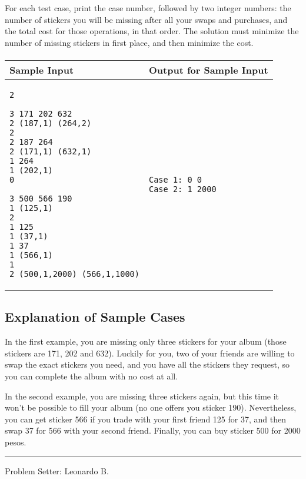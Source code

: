 \documentclass[12pt]{article}
\newcommand{\FFATitle}[1]{{%
  \color{tango-skyblue-2}\sffamily\large\bfseries\hspace{-0.4em} #1}}
\begin{document}
For each test case, print the case number, followed by two integer
numbers: the number of stickers you will be missing after all your swaps
and purchases, and the total cost for those operations, in that order.
The solution must minimize the number of missing stickers in first
place, and then minimize the cost.

\paragraph{}

\vspace{-20pt}

\noindent

\begin{tabular}{|l|l|}
  \hline
  \FFATitle{Sample Input} &
  \FFATitle{Output for Sample Input} \\
  \hline
  \begin{minipage}[t]{0.48\textwidth}
    \vspace{-8pt}
    \begin{verbatim}2

3 171 202 632
2 (187,1) (264,2)
2
2 187 264
2 (171,1) (632,1)
1 264
1 (202,1)
0

3 500 566 190
1 (125,1)
2
1 125
1 (37,1)
1 37
1 (566,1)
1
2 (500,1,2000) (566,1,1000)\end{verbatim}
    \vspace{-4pt}
  \end{minipage} &
  \begin{minipage}[t]{0.48\textwidth}
    \vspace{-8pt}
    \begin{verbatim}Case 1: 0 0
Case 2: 1 2000\end{verbatim}
    \vspace{-4pt}
  \end{minipage} \\
  \hline
\end{tabular}

\subsection{Explanation of Sample
Cases}\label{explanation-of-sample-cases}

In the first example, you are missing only three stickers for your album
(those stickers are 171, 202 and 632). Luckily for you, two of your
friends are willing to swap the exact stickers you need, and you have
all the stickers they request, so you can complete the album with no
cost at all.

In the second example, you are missing three stickers again, but this
time it won't be possible to fill your album (no one offers you sticker
190). Nevertheless, you can get sticker 566 if you trade with your first
friend 125 for 37, and then swap 37 for 566 with your second friend.
Finally, you can buy sticker 500 for 2000 pesos.

\begin{center}\rule{3in}{0.4pt}\end{center}

Problem Setter: Leonardo B.
\end{document}
